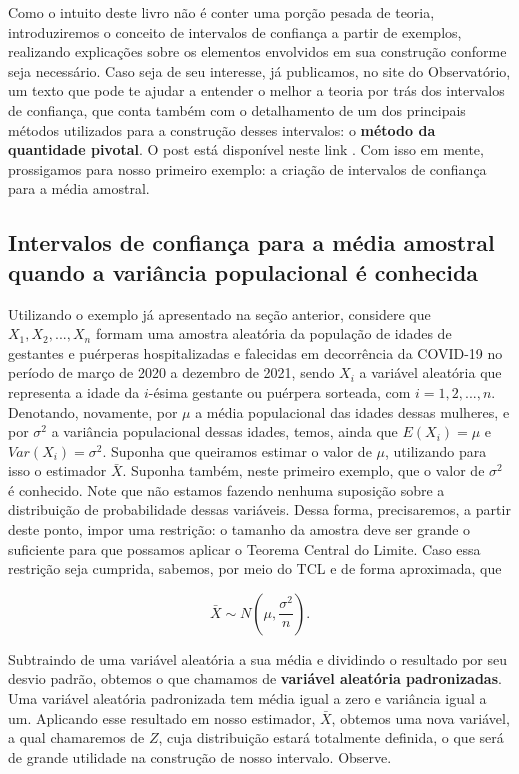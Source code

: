 \documentclass[
  letterpaper,
  DIV=11,
  numbers=noendperiod]{scrreprt}
\begin{document}
Como o intuito deste livro não é conter uma porção pesada de teoria,
introduziremos o conceito de intervalos de confiança a partir de
exemplos, realizando explicações sobre os elementos envolvidos em sua
construção conforme seja necessário. Caso seja de seu interesse, já
publicamos, no site do Observatório, um texto que pode te ajudar a
entender o melhor a teoria por trás dos intervalos de confiança, que
conta também com o detalhamento de um dos principais métodos utilizados
para a construção desses intervalos: o \textbf{método da quantidade
pivotal}. O post está disponível neste link . Com isso em mente,
prossigamos para nosso primeiro exemplo: a criação de intervalos de
confiança para a média amostral.

\hypertarget{intervalos-de-confianuxe7a-para-a-muxe9dia-amostral-quando-a-variuxe2ncia-populacional-uxe9-conhecida}{%
\subsection{Intervalos de confiança para a média amostral quando a
variância populacional é
conhecida}\label{intervalos-de-confianuxe7a-para-a-muxe9dia-amostral-quando-a-variuxe2ncia-populacional-uxe9-conhecida}}

Utilizando o exemplo já apresentado na seção anterior, considere que
\(X_1, X_2, ..., X_n\) formam uma amostra aleatória da população de
idades de gestantes e puérperas hospitalizadas e falecidas em
decorrência da COVID-19 no período de março de 2020 a dezembro de 2021,
sendo \(X_i\) a variável aleatória que representa a idade da \(i\)-ésima
gestante ou puérpera sorteada, com \(i = 1, 2, ..., n\). Denotando,
novamente, por \(\mu\) a média populacional das idades dessas mulheres,
e por \(\sigma^2\) a variância populacional dessas idades, temos, ainda
que \(E(X_i) = \mu\) e \(Var(X_i) = \sigma^2\). Suponha que queiramos
estimar o valor de \(\mu\), utilizando para isso o estimador
\(\bar{X}\). Suponha também, neste primeiro exemplo, que o valor de
\(\sigma^2\) é conhecido. Note que não estamos fazendo nenhuma suposição
sobre a distribuição de probabilidade dessas variáveis. Dessa forma,
precisaremos, a partir deste ponto, impor uma restrição: o tamanho da
amostra deve ser grande o suficiente para que possamos aplicar o Teorema
Central do Limite. Caso essa restrição seja cumprida, sabemos, por meio
do TCL e de forma aproximada, que

\[
\bar{X} \sim N \left(\mu, \frac{\sigma^2}{n} \right).
\]

Subtraindo de uma variável aleatória a sua média e dividindo o resultado
por seu desvio padrão, obtemos o que chamamos de \textbf{variável
aleatória padronizadas}. Uma variável aleatória padronizada tem média
igual a zero e variância igual a um. Aplicando esse resultado em nosso
estimador, \(\bar{X}\), obtemos uma nova variável, a qual chamaremos de
\(Z\), cuja distribuição estará totalmente definida, o que será de
grande utilidade na construção de nosso intervalo. Observe.
\end{document}
